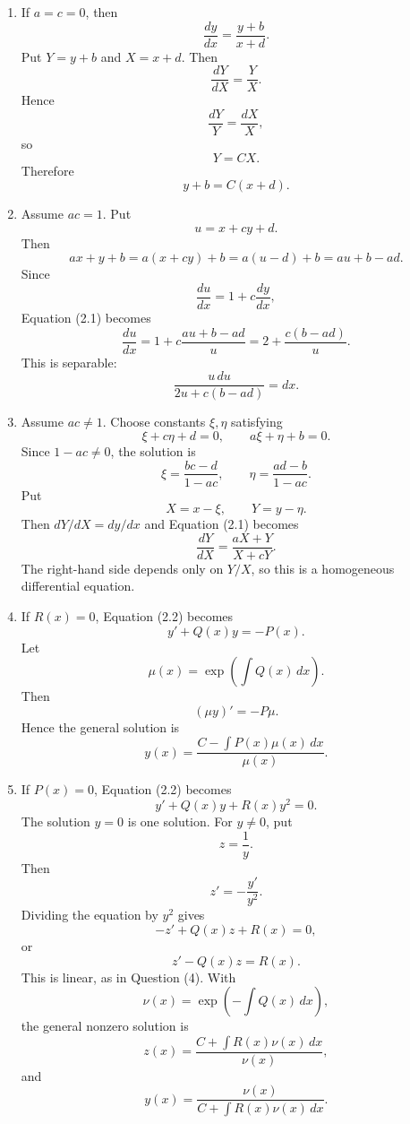 \documentclass[10pt,a4paper]{article}
\begin{document}
\begin{enumerate}
  \item If $a=c=0$, then
        \[
          \frac{dy}{dx}=\frac{y+b}{x+d}.
        \]
        Put $Y=y+b$ and $X=x+d$. Then
        \[
          \frac{dY}{dX}=\frac{Y}{X}.
        \]
        Hence
        \[
          \frac{dY}{Y}=\frac{dX}{X},
        \]
        so
        \[
          Y=CX.
        \]
        Therefore
        \[
          \boxed{y+b=C(x+d).}
        \]

  \item Assume $ac=1$. Put
        \[
          u=x+cy+d.
        \]
        Then
        \[
          ax+y+b=a(x+cy)+b=a(u-d)+b=au+b-ad.
        \]
        Since
        \[
          \frac{du}{dx}=1+c\frac{dy}{dx},
        \]
        Equation (2.1) becomes
        \[
          \frac{du}{dx}
          =
          1+c\frac{au+b-ad}{u}
          =
          2+\frac{c(b-ad)}{u}.
        \]
        This is separable:
        \[
          \boxed{
          \frac{u\,du}{2u+c(b-ad)}=dx.}
        \]

  \item Assume $ac\neq 1$. Choose constants $\xi,\eta$ satisfying
        \[
          \xi+c\eta+d=0,
          \qquad
          a\xi+\eta+b=0.
        \]
        Since $1-ac\neq0$, the solution is
        \[
          \xi=\frac{bc-d}{1-ac},
          \qquad
          \eta=\frac{ad-b}{1-ac}.
        \]
        Put
        \[
          X=x-\xi,\qquad Y=y-\eta.
        \]
        Then $dY/dX=dy/dx$ and Equation (2.1) becomes
        \[
          \boxed{
          \frac{dY}{dX}=\frac{aX+Y}{X+cY}.}
        \]
        The right-hand side depends only on $Y/X$, so this is a homogeneous differential equation.

  \item If $R(x)=0$, Equation (2.2) becomes
        \[
          y'+Q(x)y=-P(x).
        \]
        Let
        \[
          \mu(x)=\exp\left(\int Q(x)\,dx\right).
        \]
        Then
        \[
          (\mu y)'=-P\mu.
        \]
        Hence the general solution is
        \[
          \boxed{
          y(x)=\frac{C-\int P(x)\mu(x)\,dx}{\mu(x)}.}
        \]

  \item If $P(x)=0$, Equation (2.2) becomes
        \[
          y'+Q(x)y+R(x)y^2=0.
        \]
        The solution $y=0$ is one solution. For $y\neq0$, put
        \[
          z=\frac1y.
        \]
        Then
        \[
          z'=-\frac{y'}{y^2}.
        \]
        Dividing the equation by $y^2$ gives
        \[
          -z'+Q(x)z+R(x)=0,
        \]
        or
        \[
          \boxed{z'-Q(x)z=R(x).}
        \]
        This is linear, as in Question (4). With
        \[
          \nu(x)=\exp\left(-\int Q(x)\,dx\right),
        \]
        the general nonzero solution is
        \[
          z(x)=\frac{C+\int R(x)\nu(x)\,dx}{\nu(x)},
        \]
        and
        \[
          \boxed{
          y(x)=
          \frac{\nu(x)}
          {C+\int R(x)\nu(x)\,dx}.}
        \]


\end{enumerate}
\end{document}
